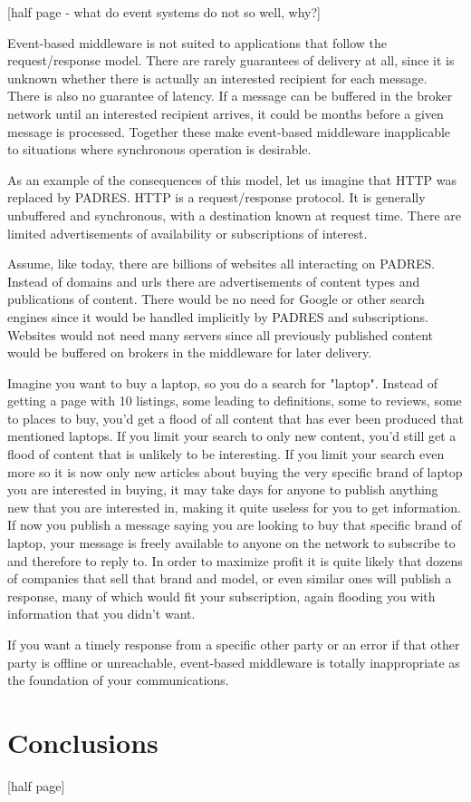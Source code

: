 \documentclass{acm_proc_article-sp}
\begin{document}
[half page - what do event systems do not so well, why?]

Event-based middleware is not suited to applications that follow the request/response model. There are rarely guarantees of delivery  at all, since it is unknown whether there is actually an interested recipient for each message. There is also no guarantee of latency. If a message can be buffered in the broker network until an interested recipient arrives, it could be months before a given message is processed. Together these make event-based middleware inapplicable to situations where synchronous operation is desirable.

As an example of the consequences of this model, let us imagine that HTTP was replaced by PADRES. HTTP is a request/response protocol. It is generally unbuffered and synchronous, with a destination known at request time. There are limited advertisements of availability or subscriptions of interest.

Assume, like today, there are billions of websites all interacting on PADRES. Instead of domains and urls there are advertisements of content types and publications of content. There would be no need for Google or other search engines since it would be handled implicitly by PADRES and subscriptions. Websites would not need many servers since all previously published content would be buffered on brokers in the middleware for later delivery.

Imagine you want to buy a laptop, so you do a search for "laptop". Instead of getting a page with 10 listings, some leading to definitions, some to reviews, some to places to buy, you'd get a flood of all content that has ever been produced that mentioned laptops. If you limit your search to only new content, you'd still get a flood of content that is unlikely to be interesting. If you limit your search even more so it is now only new articles about buying the very specific brand of laptop you are interested in buying, it may take days for anyone to publish anything new that you are interested in, making it quite useless for you to get information. If now you publish a message saying you are looking to buy that specific brand of laptop, your message is freely available to anyone on the network to subscribe to and therefore to reply to. In order to maximize profit it is quite likely that dozens of companies that sell that brand and model, or even similar ones will publish a response, many of which would fit your subscription, again flooding you with information that you didn't want.

If you want a timely response from a specific other party or an error if that other party is offline or unreachable, event-based middleware is totally inappropriate as the foundation of your communications.



\section{Conclusions}

[half page]




\balancecolumns
\end{document}
